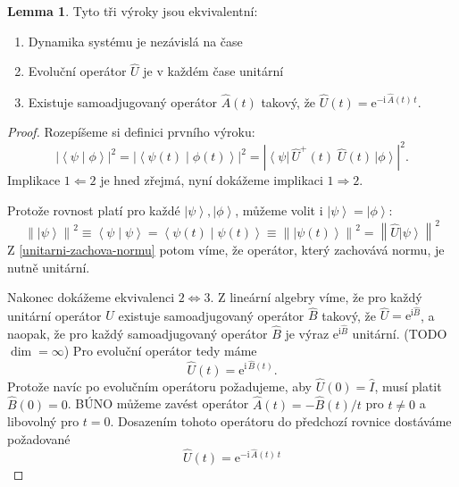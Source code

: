 \documentclass[10pt,a4paper]{article}
\theoremstyle{definition}
\newtheorem{lemma}[theorem]{Lemma}
\newcommand{\const}[1]{\mathrm{#1}}
\newcommand{\norm}[1]{\left\lVert#1\right\rVert}
\newcommand{\abs}[1]{\left| #1 \right|}
\newcommand{\bra}[1]{\left< #1 \right|}
\newcommand{\ket}[1]{\left| #1 \right>}
\newcommand{\braket}[2]{\left< #1 \middle| #2 \right>}
\newcommand{\e}[1]{\const{e}^{#1}}
\renewcommand{\i}{\const{i}}
\def\1{\hat{I}}
\begin{document}
\begin{lemma} \label{dyn-sys-charakteristika}
    Tyto tři výroky jsou ekvivalentní:
    \begin{enumerate}
        \item Dynamika systému je nezávislá na čase
        \item Evoluční operátor $\hat U$ je v každém čase unitární
        \item Existuje samoadjugovaný operátor $\hat A(t)$ takový, že $\hat{U}(t) = \e{-\i \, \hat{A}(t) \, t}$.
    \end{enumerate}
\end{lemma}
\begin{proof}
    Rozepíšeme si definici prvního výroku:
    \begin{equation*}
        \abs{\braket{\psi}{\phi}}^2 = \abs{\braket{\psi(t)}{\phi(t)}}^2 = \abs{\bra{\psi} \, \hat{U}^+\!(t) \; \hat{U}(t) \, \ket{\phi}}^2.
    \end{equation*}
    Implikace $1 \Leftarrow 2$ je hned zřejmá, nyní dokážeme implikaci $1 \Rightarrow 2$.

    Protože rovnost platí pro každé $\ket{\psi}, \ket{\phi}$, můžeme volit i $\ket{\psi} = \ket{\phi}$:
    \begin{equation*}
        \norm{\ket\psi}^2
        \equiv \braket{\psi}{\psi}
        = \braket{\psi(t)}{\psi(t)}
        \equiv \norm{\ket{\psi(t)}}^2
        = \norm{\hat U \ket\psi}^2
    \end{equation*}
    Z \ref{unitarni-zachova-normu} potom víme, že operátor, který zachovává normu, je nutně unitární.

    Nakonec dokážeme ekvivalenci $2 \Leftrightarrow 3$. Z lineární algebry víme, že pro každý unitární operátor $\hat U$ existuje samoadjugovaný operátor $\hat B$ takový, že $\hat U = \e{ \i \hat B}$, a naopak, že pro každý samoadjugovaný operátor $\hat B$ je výraz $\e{ \i \hat B}$ unitární. (TODO $\dim = \infty$) Pro evoluční operátor tedy máme
    \begin{equation*}
        \hat U(t) = \e{\i \, \hat B(t)}.
    \end{equation*}
    Protože navíc po evolučním operátoru požadujeme, aby $\hat U(0) = \1$, musí platit $\hat B(0) = 0$. BÚNO můžeme zavést operátor $\hat A(t) = - \hat B(t) / t$ pro $t \neq 0$ a libovolný pro $t=0$. Dosazením tohoto operátoru do předchozí rovnice dostáváme požadované
    \begin{equation*}
        \hat U(t) = \e{-\i \, \hat A(t) \, t}
    \end{equation*}
\end{proof}
\end{document}
